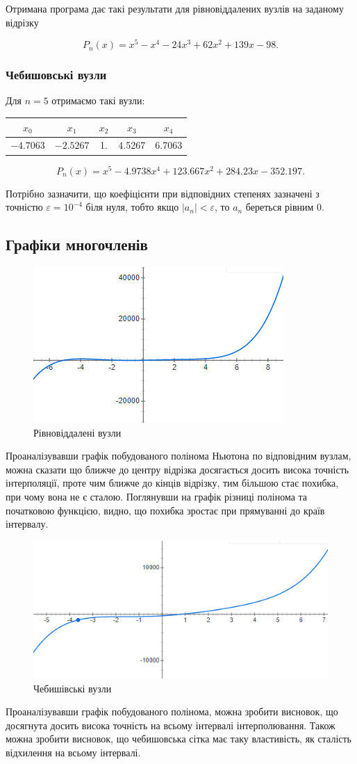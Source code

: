 \documentclass[12pt, a4paper]{article}
\theoremstyle{definition}
\renewcommand{\epsilon}{\varepsilon}
\numberwithin{equation}{section}
\begin{document}
Отримана програма дає такі результати для рівновіддалених вузлів на заданому відрізку

\[P_n(x) = x^5 - x^4 - 24x^3 + 62 x^2 + 139 x - 98.\]

\subsubsection{Чебишовські вузли}
Для $n = 5$ отримаємо такі вузли:
\begin{table}[H]
	\centering
	\begin{tabular}{|c|c|c|c|c|}
	\hline
	$x_0$ & $x_1$ & $x_2$ & $x_3$ & $x_4$\\ \hline
	$-4.7063$ & $-2.5267$ & 1. & 4.5267 & 6.7063 \\ \hline
	\end{tabular}
\end{table}

\[P_n(x) = x^5 - 4.9738 x^4 + 123.667 x^2 + 284.23 x - 352.197.\]

Потрібно зазначити, що коефіцієнти при відповідних степенях зазначені з точністю $\epsilon = 10^{-4}$ біля нуля, тобто якщо $|a_n|<\epsilon$, то $a_n$ береться рівним $0$.

\subsection{Графіки многочленів}

\begin{figure}[H]
	\centering
	\includegraphics[width=.5\linewidth]{P_newton.png}
	\caption{Рівновіддалені вузли}
\end{figure}

Проаналізувавши графік побудованого полінома Ньютона по відповідним вузлам, можна сказати що ближче до центру відрізка досягається досить висока точність інтерполяції, проте чим ближче до кінців відрізку, тим більшою стає похибка, при чому вона не є сталою. Поглянувши на графік різниці полінома та початковою функцією, видно, що похибка зростає при прямуванні до країв інтервалу.

\begin{figure}[H]
	\centering
	\includegraphics[width=.5\linewidth]{P_chebyshev.png}
	\caption{Чебишівські вузли}
\end{figure}

Проаналізувавши графік побудованого полінома, можна зробити висновок, що досягнута досить висока точність на всьому інтервалі інтерполювання. Також можна зробити висновок, що чебишовська сітка має таку властивість, як сталість відхилення на всьому інтервалі.
\end{document}
